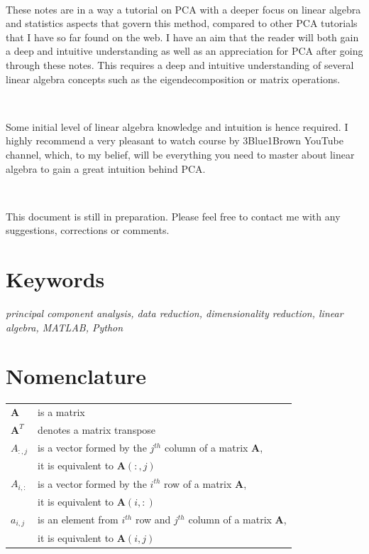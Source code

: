 \documentclass[10pt,twocolumn]{article}
\begin{document}
\,\,

These notes are in a way a tutorial on PCA with a deeper focus on linear algebra and statistics aspects that govern this method, compared to other PCA tutorials that I have so far found on the web. I have an aim that the reader will both gain a deep and intuitive understanding as well as an appreciation for PCA after going through these notes. This requires a deep and intuitive understanding of several linear algebra concepts such as the eigendecomposition or matrix operations. 

\,\,

Some initial level of linear algebra knowledge and intuition is hence required.
I highly recommend a very pleasant to watch course by 3Blue1Brown YouTube channel, which, to my belief, will be everything you need to master about linear algebra to gain a great intuition behind PCA.

\,\,

This document is still in preparation. Please feel free to contact me with any suggestions, corrections or comments.

\section*{Keywords}

\textit{principal component analysis, data reduction, dimensionality reduction, linear algebra, MATLAB\textregistered, Python}

\tableofcontents

\section{Nomenclature}

\begin{tabular}{ll}
    $\bm{A}$ & is a matrix \\
     $\bm{A}^T$ & denotes a matrix transpose \\
    $A_{:,j}$ & is a vector formed by the $j^{th}$ column of a matrix $\bm{A}$, \\
    & it is equivalent to  $\bm{A}(:,j)$ \\
    $A_{i,:}$ & is a vector formed by the $i^{th}$ row of a matrix $\bm{A}$, \\
    & it is equivalent to  $\bm{A}(i,:)$ \\
    $a_{i,j}$ & is an element from $i^{th}$ row and $j^{th}$ column of a matrix $\bm{A}$, \\ 
    & it is equivalent to  $\bm{A}(i,j)$ \\
\end{tabular}
\end{document}
